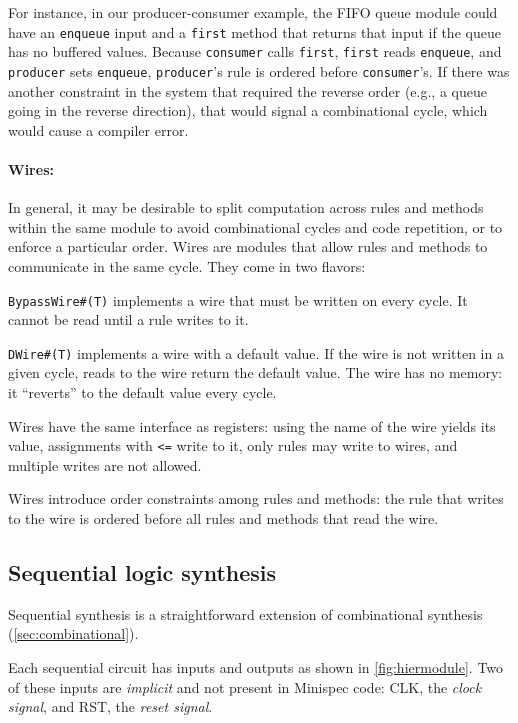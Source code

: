 For instance, in our producer-consumer example, the FIFO queue module could have an
\texttt{enqueue} input and a \texttt{first} method that returns that input if the queue has no buffered values.
Because \texttt{consumer} calls \texttt{first}, \texttt{first} reads \texttt{enqueue}, and \texttt{producer}
sets \texttt{enqueue}, \texttt{producer}'s rule is ordered before \texttt{consumer}'s.
If there was another constraint in the system that required the reverse order
(e.g., a queue going in the reverse direction), that would signal a combinational cycle,
which would cause a compiler error.

\paragraph{Wires:}
In general, it may be desirable to split computation across rules and methods
within the same module to avoid combinational cycles and code repetition, or to enforce a particular order.
Wires are modules that allow rules and methods to communicate in the same cycle.
They come in two flavors:
\begin{compactitem}
\item \verb|BypassWire#(T)| implements a wire that must be written on every cycle. It cannot be read until a rule writes to it.
\item \verb|DWire#(T)| implements a wire with a default value. If the wire is not written in a given cycle,
  reads to the wire return the default value. The wire has no memory: it ``reverts'' to the default value every cycle.
\end{compactitem}
Wires have the same interface as registers: using the name of the wire yields its value,
assignments with \verb|<=| write to it, only rules may write to wires, and multiple writes are not allowed.

Wires introduce order constraints among rules and methods:
the rule that writes to the wire is ordered before all rules and methods that read the wire.

\subsection{Sequential logic synthesis}
\label{sec:sequential}

Sequential synthesis is a straightforward extension of combinational synthesis (\autoref{sec:combinational}).

Each sequential circuit has inputs and outputs as shown in \autoref{fig:hiermodule}.
Two of these inputs are \emph{implicit} and not present in Minispec code:
CLK, the \emph{clock signal}, and RST, the \emph{reset signal}.


